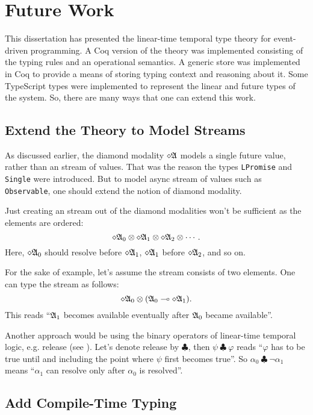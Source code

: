 \chapter{Future Work}

This dissertation has presented the linear-time temporal type theory for event-driven programming. A Coq version of the theory was implemented consisting of the typing rules and an operational semantics. A generic store was implemented in Coq to provide a means of storing typing context and reasoning about it. Some TypeScript types were implemented to represent the linear and future types of the system. So, there are many ways that one can extend this work.

\section{Extend the Theory to Model Streams}

As discussed earlier, the diamond modality $\diamond\mathfrak{A}$ models a single future value, rather than an stream of values. That was the reason the types \texttt{LPromise} and \texttt{Single} were introduced. But to model async stream of values such as \texttt{Observable}, one should extend the notion of diamond modality.

Just creating an stream out of the diamond modalities won't be sufficient as the elements are ordered:
\[
\diamond\mathfrak{A}_0 \otimes \diamond\mathfrak{A}_1 \otimes \diamond\mathfrak{A}_2 \otimes \cdots.
\]
Here, $\diamond\mathfrak{A}_0$ should resolve before $\diamond\mathfrak{A}_1$, $\diamond\mathfrak{A}_1$ before $\diamond\mathfrak{A}_2$, and so on.

For the sake of example, let's assume the stream consists of two elements. One can type the stream as follows:
\[
\diamond\mathfrak{A}_0 \otimes (\mathfrak{A}_0 \multimap \diamond\mathfrak{A}_1).
\]
This reads ``$\mathfrak{A}_1$ becomes available eventually after $\mathfrak{A}_0$ became available''.

Another approach would be using the binary operators of linear-time temporal logic, e.g. release (see \cite{DBLP:conf/focs/Pnueli77}). Let's denote release by $\clubsuit$, then $\psi~\clubsuit~\varphi$ reads ``$\varphi$ has to be true until and including the point where $\psi$ first becomes true''. So $\alpha_0~\clubsuit~\neg\alpha_1$ means ``$\alpha_1$ can resolve only after $\alpha_0$ is resolved''.

\section{Add Compile-Time Typing}

